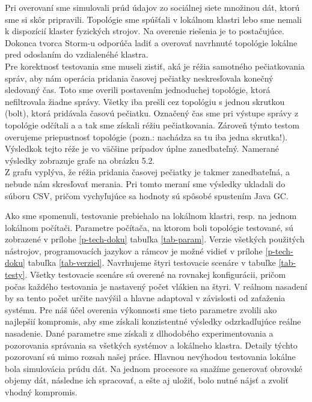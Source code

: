\label{fig:visualvm}

Pri overovaní sme simulovali prúd údajov zo sociálnej siete množinou dát, ktorú sme si skôr pripravili. Topológie sme spúšťali v lokálnom klastri lebo sme nemali k dispozícií klaster fyzických strojov. Na overenie riešenia je to postačujúce. Dokonca tvorca Storm-u odporúča ladiť a overovať navrhnuté topológie lokálne pred odoslaním do vzdialenéhé klastra. 
\\[5pt]
Pre korektnosť testovania sme museli zistiť, aká je réžia samotného pečiatkovania správ, aby nám operácia pridania časovej pečiatky neskresľovala konečný sledovaný čas. Toto sme overili postavením jednoduchej topológie, ktorá nefiltrovala žiadne správy. Všetky iba prešli cez topológiu s jednou skrutkou (bolt), ktorá pridávala časovú pečiatku. Označený čas sme pri výstupe správy z topológie odčítali a a tak sme získali réžiu pečiatkovania. Zároveň týmto testom overujeme priepustnosť topológie (pozn.: nachádza sa tu iba jedna skrutka!). Výsledkok tejto réže je vo väčšine prípadov úplne zanedbateľný. Namerané výsledky zobrazuje grafe na obrázku 5.2. 
\\[5pt]
Z grafu vyplýva, že réžia pridania časovej pečiatky je takmer zanedbateľná, a nebude nám skresľovať merania. Pri tomto meraní sme výsledky ukladali do súboru CSV, pričom vychyľujúce sa hodnoty sú spôsobé spustením Java GC.

\label{fig:exp-timestamping-overheads} 

Ako sme spomenuli, testovanie prebiehalo na lokálnom klastri, resp. na jednom lokálnom počítači. Parametre počítača, na ktorom boli topológie testované, sú zobrazené v prílohe \ref{p-tech-doku} tabuľka \ref{tab-param}. Verzie všetkých použitých nástrojov, programovacích jazykov a rámcov je možné vidieť v prílohe \ref{p-tech-doku} tabuľka \ref{tab-verziel}. Navrhujeme štyri testovacie scenáre v tabuľke \ref{tab-testy}. Všetky testovacie scenáre sú overené na rovnakej konfigurácii, pričom počas každého testovania je nastavený počet vlákien na štyri. V reálnom nasadení by sa tento počet určite navýšil a hlavne adaptoval v závislosti od zaťaženia systému. 
Pre náš účel overenia výkonnosti sme tieto parametre zvolili ako najlepšií kompromis, aby sme získali konzistentné výsledky odzrkadľujúce reálne nasadenie. Dané parametre sme získali z dlhodobého experimentovania a pozorovania správania sa všetkých systémov a lokálneho klastra. Detaily týchto pozorovaní sú mimo rozsah našej práce. Hlavnou nevýhodou testovania lokálne bola simulovácia prúdu dát. Na jednom procesore sa snažíme generovať obrovské objemy dát, následne ich spracovať, a ešte aj uložiť, bolo nutné nájsť a zvoliť vhodný kompromis. \\



